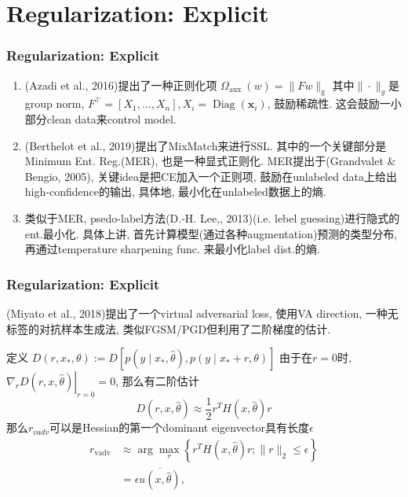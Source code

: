 \documentclass{beamer}
\newcommand{\bs}[1]{\boldsymbol{#1}}
\begin{document}
\section{Regularization: Explicit}

\begin{frame}
    \frametitle{Regularization: Explicit}

    \begin{enumerate}
        \item (Azadi et al., 2016)提出了一种正则化项
        $\Omega_{\text {aux }}(w)=\|F w\|_{\mathrm{g}}$
        其中$\|\cdot\|_{g}$是group norm,
        $F^{\top}=\left[X_{1}, \ldots, X_{n}\right], X_i=\operatorname{Diag}(\bs x_i)$,
        鼓励稀疏性. 这会鼓励一小部分clean data来control model.
        \item (Berthelot et al., 2019)提出了MixMatch来进行SSL. 其中的一个关键部分是Minimum Ent. Reg.(MER), 也是一种显式正则化. MER提出于(Grandvalet \&  Bengio, 2005), 关键idea是把CE加入一个正则项, 鼓励在unlabeled data上给出high-confidence的输出, 具体地, 最小化在unlabeled数据上的熵.
        \item 类似于MER, psedo-label方法(D.-H.   Lee,, 2013)(i.e. lebel guessing)进行隐式的ent.最小化. 具体上讲, 首先计算模型(通过各种augmentation)预测的类型分布, 再通过temperature sharpening func. 来最小化label dist.的熵.
    \end{enumerate}

\end{frame}

\begin{frame}
    \frametitle{Regularization: Explicit}

    (Miyato et al., 2018)提出了一个virtual adversarial loss, 使用VA direction, 一种无标签的对抗样本生成法, 类似FGSM/PGD但利用了二阶梯度的估计.

    定义
    $D\left(r, x_{*}, \theta\right) := D\left[p\left(y \mid x_{*}, \hat{\theta}\right), p\left(y \mid x_{*}+r, \theta\right)\right]$
    由于在$r=0$时, $\left.\nabla_{r} D(r, x, \hat{\theta})\right|_{r=0}=0$, 那么有二阶估计
    \begin{equation}
        D(r, x, \hat{\theta}) \approx \frac{1}{2} r^{T} H(x, \hat{\theta}) r
    \end{equation}
    那么$r_{vadv}$可以是Hessian的第一个dominant eigenvector具有长度$\epsilon$
    \begin{equation}
        \begin{aligned}
        r_{\mathrm{vadv}} & \approx \arg \max _{r}\left\{r^{T} H(x, \hat{\theta}) r ;\|r\|_{2} \leq \epsilon\right\} \\
        &=\epsilon \overline{u(x, \hat{\theta})},
        \end{aligned}
    \end{equation}
    

\end{frame}
\end{document}
